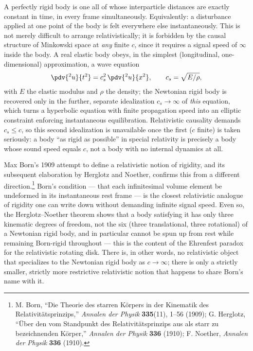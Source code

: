 A perfectly rigid body is one all of whose interparticle distances are exactly
constant in time, in every frame simultaneously. Equivalently: a disturbance
applied at one point of the body is felt everywhere else instantaneously. This
is not merely difficult to arrange relativistically; it is forbidden by the
causal structure of Minkowski space at \emph{any} finite $c$, since it requires
a signal speed of $\infty$ inside the body. A real elastic body obeys, in the
simplest (longitudinal, one-dimensional) approximation, a wave equation
\begin{equation}
\pdv{^2 u}{t^2} = c_s^2\, \pdv{^2 u}{x^2}, \qquad c_s = \sqrt{E/\rho},
\end{equation}
with $E$ the elastic modulus and $\rho$ the density; the Newtonian rigid body
is recovered only in the further, separate idealization $c_s\to\infty$ of
\emph{this} equation, which turns a hyperbolic equation with finite propagation
speed into an elliptic constraint enforcing instantaneous equilibration.
Relativistic causality demands $c_s \le c$, so this second idealization is
unavailable once the first ($c$ finite) is taken seriously: a body ``as rigid
as possible'' in special relativity is precisely a body whose sound speed
equals $c$, not a body with no internal dynamics at all.

Max Born's 1909 attempt to define a relativistic notion of rigidity, and its
subsequent elaboration by Herglotz and Noether, confirms this from a different
direction.\footnote{M. Born, ``Die Theorie des starren K\"orpers in der
Kinematik des Relativit\"atsprinzips,'' \emph{Annalen der Physik}
\textbf{335}(11), 1--56 (1909); G. Herglotz, ``\"Uber den vom Standpunkt des
Relativit\"atsprinzips aus als starr zu bezeichnenden K\"orper,'' \emph{Annalen
der Physik} \textbf{336} (1910); F. Noether, \emph{Annalen der Physik}
\textbf{336} (1910).} Born's condition --- that each infinitesimal volume
element be undeformed in its instantaneous rest frame --- is the closest
relativistic analogue of rigidity one can write down without demanding infinite
signal speed. Even so, the Herglotz--Noether theorem shows that a body
satisfying it has only three kinematic degrees of freedom, not the six (three
translational, three rotational) of a Newtonian rigid body, and in particular
cannot be spun up from rest while remaining Born-rigid throughout --- this is
the content of the Ehrenfest paradox for the relativistic rotating disk. There
is, in other words, no relativistic object that specializes to the Newtonian
rigid body as $c\to\infty$; there is only a strictly smaller, strictly more
restrictive relativistic notion that happens to share Born's name with it.

